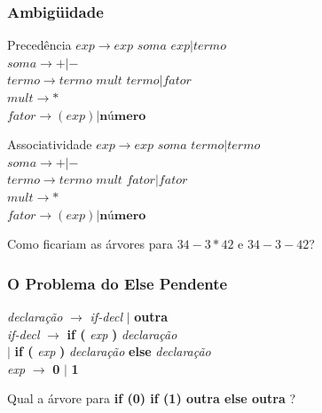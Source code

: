 \documentclass[table]{beamer}
\begin{document}
\begin{frame}
   \frametitle{Ambigüidade}
   \begin{block}{Precedência}
   $\textit{exp} \to \textit{exp soma exp} | \textit{termo}$ \\
   $\textit{soma} \to +|-$ \\
   $\textit{termo} \to \textit{termo mult termo} | \textit{fator}$ \\
   $\textit{mult} \to *$ \\
   $\textit{fator} \to (\textit{exp}) | \textbf{número}$
   \end{block}
   \begin{block}{Associatividade}
   $\textit{exp} \to \textit{exp soma termo} | \textit{termo}$ \\
   $\textit{soma} \to +|-$ \\
   $\textit{termo} \to \textit{termo mult fator} | \textit{fator}$ \\
   $\textit{mult} \to *$ \\
   $\textit{fator} \to (\textit{exp}) | \textbf{número}$
   \end{block}
   Como ficariam as árvores para $34-3*42$ e $34-3-42$?
\end{frame}

\begin{frame}
   \frametitle{O Problema do Else Pendente}
   \textit{declaração} $\to$ \textit{if-decl} $|$ \textbf{outra} \\
   \textit{if-decl} $\to$ \textbf{if (} \textit{exp} \textbf{)} \textit{declaração} \\
   \hspace{1.3cm} $|$ \textbf{if (} \textit{exp} \textbf{)} \textit{declaração} \textbf{else} \textit{declaração} \\
   \textit{exp} $\to$ \textbf{0} $|$ \textbf{1}

   \vspace{1.0cm}
   \centering
   Qual a árvore para \textbf{if (0) if (1) outra else outra} ?
\end{frame}
\end{document}
